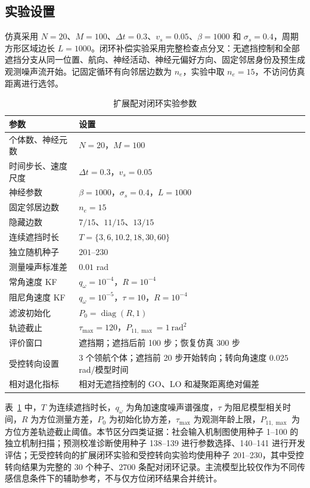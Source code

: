 \documentclass[UTF8,fontset=windows,11pt]{ctexart}
\begin{document}
\subsection{实验设置}

仿真采用 $N=20$、$M=100$、$\Delta t=0.3$、$v_s=0.05$、$\beta=1000$ 和 $\sigma_s=0.4$，周期方形区域边长 $L=1000$。闭环补偿实验采用完整检查点分叉：无遮挡控制和全部遮挡分支从同一位置、航向、神经活动、神经元偏好方向、固定邻居身份及预生成观测噪声流开始。记固定循环有向邻居边数为 $n_e$，实验中取 $n_e=15$，不访问仿真距离进行选邻。

\begin{table}[htbp]
 \centering
 \small
 \caption{扩展配对闭环实验参数}
 \label{tab:simulation_setup}
 \begin{tabular}{ll}
 \toprule
 参数 & 设置\\
 \midrule
 个体数、神经元数 & $N=20$，$M=100$\\
 时间步长、速度尺度 & $\Delta t=0.3$，$v_s=0.05$\\
 神经参数 & $\beta=1000$，$\sigma_s=0.4$，$L=1000$\\
 固定邻居边数 & $n_e=15$\\
 隐藏边数 & $7/15$、$11/15$、$13/15$\\
 连续遮挡时长 & $T=\{3,6,10.2,18,30,60\}$\\
 独立随机种子 & $201$--$230$\\
 测量噪声标准差 & $0.01$ rad\\
 常角速度 KF & $q_\omega=10^{-4}$，$R=10^{-4}$\\
 阻尼角速度 KF & $q_\omega=10^{-5}$，$\tau=10$，$R=10^{-4}$\\
 滤波初始化 & $P_0=\operatorname{diag}(R,1)$\\
轨迹截止 & $\tau_{\max}=120$，$P_{11,\max}=1\ \mathrm{rad}^2$\\
评价窗口 & 遮挡期；遮挡后前 100 步；恢复仿真 300 步\\
受控转向设置 & 3 个领航个体；遮挡前 20 步开始转向；转向角速度 $0.025$ rad/模型时间\\
相对退化指标 & 相对无遮挡控制的 GO、LO 和凝聚距离绝对偏差\\
 \bottomrule
 \end{tabular}
\end{table}

表~\ref{tab:simulation_setup} 中，$T$ 为连续遮挡时长，$q_\omega$ 为角加速度噪声谱强度，$\tau$ 为阻尼模型相关时间，$R$ 为方位测量方差，$P_0$ 为初始化协方差，$\tau_{\max}$ 为观测年龄上限，$P_{11,\max}$ 为方位方差轨迹截止阈值。本节区分四类证据：社会输入机制图使用种子 1--100 的独立机制扫描；预测校准诊断使用种子 138--139 进行参数选择、140--141 进行开发评估；无受控转向的扩展闭环实验和受控转向实验均使用种子 201--230，其中受控转向结果为完整的 $30$ 个种子、$2700$ 条配对闭环记录。主流模型比较仅作为不同传感信息条件下的辅助参考，不与仅方位闭环结果合并统计。
\end{document}
